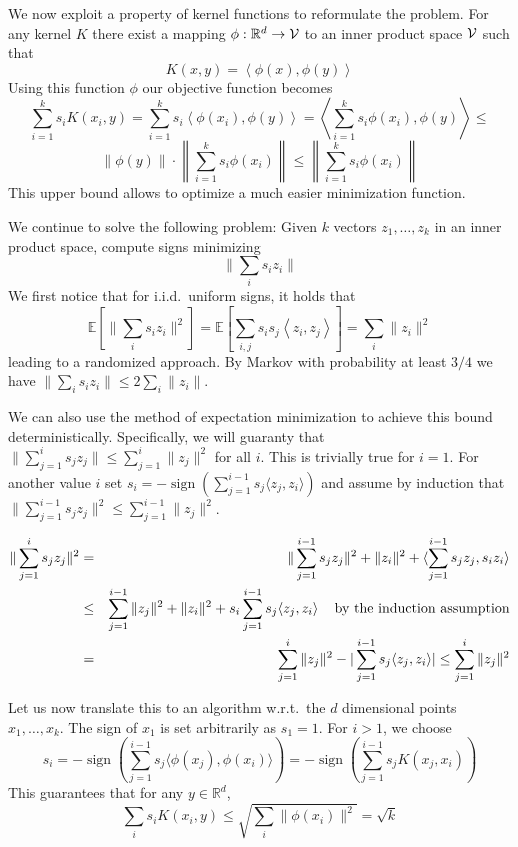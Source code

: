 \documentclass{article} %
\newcommand{\ip}[1]{\left \langle #1 \right \rangle}
\newcommand{\R}{\mathbb{R}}
\newcommand{\E}{\mathbb{E}}
\begin{document}
We now exploit a property of kernel functions to reformulate the problem. For any kernel $K$ there exist a mapping $\phi: \R^d \to {\cal V}$ to an inner product space $\cal V$ such that 
$$ K(x,y) = \ip{\phi(x), \phi(y)} $$
Using this function $\phi$ our objective function becomes
$$\sum_{i=1}^k s_i K(x_i,y) = \sum_{i=1}^k s_i \ip{\phi(x_i), \phi(y)} =  \ip{ \sum_{i=1}^k s_i \phi(x_i), \phi(y)} \leq $$
$$ \|\phi(y)\| \cdot \left\|  \sum_{i=1}^k s_i \phi(x_i) \right\| \leq  \left\|  \sum_{i=1}^k s_i \phi(x_i) \right\| $$
This upper bound allows to optimize a much easier minimization function. 

We continue to solve the following problem: Given $k$ vectors $z_1,\ldots,z_k$ in an inner product space, compute signs minimizing 
$$\| \sum_i s_i z_i \| $$
We first notice that for i.i.d.\ uniform signs, it holds that
$$\E[\| \sum_i s_i z_i \|^2] = \E[\sum_{i,j} s_i s_j \ip{z_i, z_j}] = \sum_i \|z_i\|^2 $$
leading to a randomized approach. By Markov with probability at least $3/4$ we have $\| \sum_i s_i z_i \| \le 2\sum_i \|z_i\|$.

We can also use the method of expectation minimization to achieve this bound deterministically.
Specifically, we will guaranty that $\| \sum_{j=1}^i s_j z_j \| \le \sum_{j=1}^i \|z_j\|^2$ for all $i$.
This is trivially true for $i=1$. 
For another value $i$ set $s_i = -\operatorname{sign} (\sum_{j=1}^{i-1}s_j \langle z_j, z_i \rangle)$ 
and  assume by induction that $\| \sum_{j=1}^{i-1} s_j z_j\|^2 \le \sum_{j=1}^{i-1} \|z_j\|^2$.

\begin{eqnarray*}
\| \sum_{j=1}^{i}s_j z_j\|^2 &=& \|\sum_{j=1}^{i-1}s_j z_j\|^2 + \|z_i\|^2 + \langle \sum_{j=1}^{i-1}s_j z_j, s_i z_i\rangle \\
&\le& \sum_{j=1}^{i-1} \|z_j\|^2 + \|z_i\|^2 + s_i \sum_{j=1}^{i-1}s_j \langle  z_j,  z_i\rangle \mbox{\;\;\; by the induction assumption}\\ 
&=& \sum_{j=1}^{i} \|z_j\|^2 - |\sum_{j=1}^{i-1}s_j \langle  z_j,  z_i\rangle| \le \sum_{j=1}^{i} \|z_j\|^2
\end{eqnarray*}


Let us now translate this to an algorithm w.r.t.\ the $d$ dimensional points $x_1,\ldots, x_k$. 
The sign of $x_1$ is set arbitrarily as $s_1=1$. For $i>1$, we choose 
$$ s_i = -\operatorname{sign} (\sum_{j=1}^{i-1}s_j \langle \phi(x_j), \phi(x_i) \rangle) = -\operatorname{sign} (\sum_{j=1}^{i-1}s_j  K(x_j, x_i)) $$
This guarantees that for any $y \in \R^d$,
$$ \sum_i s_i K(x_i, y) \leq \sqrt{ \sum_i \|\phi(x_i)\|^2 } = \sqrt{k} $$
\end{document}
